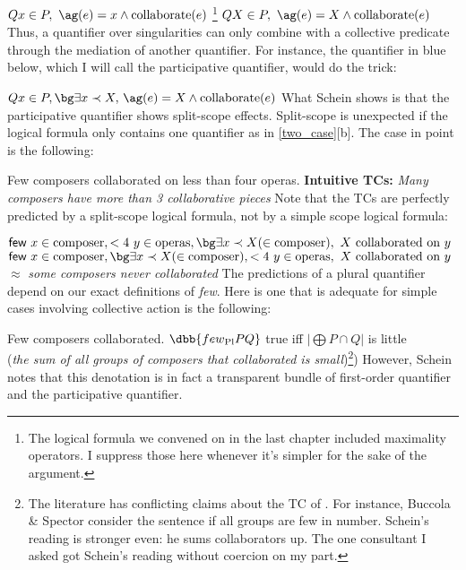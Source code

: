 \pex \label{two_case}
\a 
\ljudge* $Q x\in P,\ \ag(e) = x \wedge \text{collaborate}(e)$
\footnote{
The logical formula we convened on in the last chapter included maximality operators. I suppress those here whenever it's simpler for the sake of the argument.
}
\a 
\ljudge{$\checkmark$} $Q X\in P,\ \ag(e) = X \wedge \text{collaborate}(e)$
\xe
%
Thus, a quantifier over singularities can only combine with a collective predicate through the mediation of another quantifier. For instance, the quantifier in {\bg blue} below, which I will call the participative quantifier, would do the trick:

\ex
\ljudge{$\checkmark$} $Q x\in P, {\bg \exists x\prec X,}\ \ag(e) = X \wedge \text{collaborate}(e)$
\xe
%
What Schein shows is that the {\bg participative} quantifier shows split-scope effects. Split-scope is unexpected if the logical formula only contains one quantifier as in \cref{two_case}[b]. The case in point is the following:

\pex
\a
Few composers collaborated on less than four operas.
\a 
\textbf{Intuitive TCs:}
\emph{Many composers have more than 3 collaborative pieces}
\xe
%
Note that the TCs are perfectly predicted by a split-scope logical formula, not by a simple scope logical formula:

\pex
\a 
$\textsf{few }x \in \text{composer}, <4\ y\in \text{operas}, {\bg \exists x\prec X (\in \text{composer})},\ X\text{ collaborated on }y$
\a 
$\textsf{few }x \in \text{composer}, {\bg \exists x\prec X (\in \text{composer})}, <4\ y\in \text{operas},\ X\text{ collaborated on }y$\label{bad}
$\approx$ \emph{some composers never collaborated}
\xe
%
The predictions of a plural quantifier depend on our exact definitions of \emph{few}. Here is one that is adequate for simple cases involving collective action is the following:

\pex
\a
Few composers collaborated.
\a 
$\dbb{few\textsubscript{Pl} P Q}$ true iff $|\bigoplus P\cap Q|$ is little\\
(\emph{the sum of all groups of composers that collaborated is small})\footnote{
The literature has conflicting claims about the TC of \cnextxa. For instance, Buccola \& Spector consider the sentence if all groups are few in number. Schein's reading is stronger even: he sums collaborators up. The one consultant I asked got Schein's reading without coercion on my part.
})
\xe
%
However, Schein notes that this denotation is in fact a transparent bundle of first-order quantifier and the {\bg participative} quantifier. 


